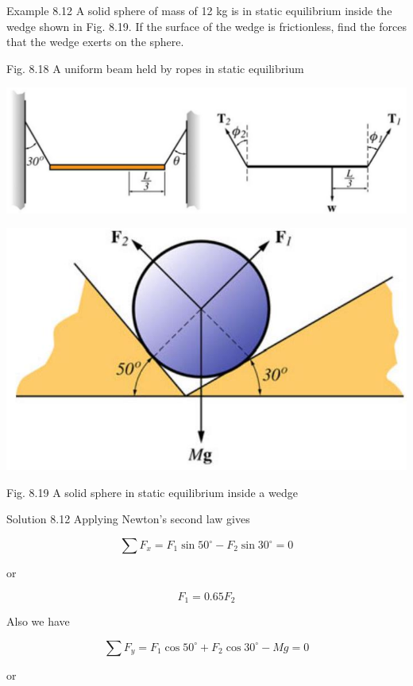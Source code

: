 \documentclass[10pt]{article}
\begin{document}
Example 8.12 A solid sphere of mass of 12 kg is in static equilibrium inside the wedge shown in Fig. 8.19. If the surface of the wedge is frictionless, find the forces that the wedge exerts on the sphere.

Fig. 8.18 A uniform beam held by ropes in static equilibrium

\begin{center}
\includegraphics[max width=\textwidth]{2024_09_13_db1f357d2aad0a03eb2eg-140(1)}
\end{center}

\begin{center}
\includegraphics[max width=\textwidth]{2024_09_13_db1f357d2aad0a03eb2eg-140}
\end{center}

Fig. 8.19 A solid sphere in static equilibrium inside a wedge

Solution 8.12 Applying Newton's second law gives

$$
\sum F_{x}=F_{1} \sin 50^{\circ}-F_{2} \sin 30^{\circ}=0
$$

or

$$
F_{1}=0.65 F_{2}
$$

Also we have

$$
\sum F_{y}=F_{1} \cos 50^{\circ}+F_{2} \cos 30^{\circ}-M g=0
$$

or
\end{document}
